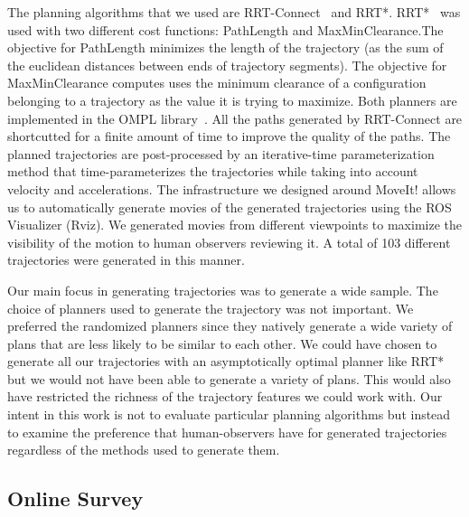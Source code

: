 \documentclass[letterpaper, 10 pt, conference]{ieeeconf}  %
\begin{document}
The planning algorithms that we used are RRT-Connect~\cite{kuffner2000rrt} and RRT*.  RRT*~\cite{frazzoli-RRTstar} was used with two different cost functions: PathLength and MaxMinClearance.The objective for PathLength minimizes the length of the trajectory (as the sum of the euclidean distances between ends of trajectory segments). The objective for MaxMinClearance computes uses the minimum clearance of a configuration belonging to a trajectory as the value it is trying to maximize. Both planners are implemented in the OMPL library~\cite{OMPL:2012}. All the paths generated by RRT-Connect are shortcutted for a finite amount of time to improve the quality of the paths. The planned trajectories are post-processed by an iterative-time parameterization method that time-parameterizes the trajectories while taking into account velocity and accelerations. The infrastructure we designed around MoveIt! allows us to automatically generate movies of the generated trajectories using the ROS Visualizer (Rviz). We generated movies from different viewpoints to maximize the visibility of the motion to human observers reviewing it. A total of 103 different trajectories were generated in this manner. 

Our main focus in generating trajectories was to generate a wide sample. The choice of planners used to generate the trajectory was not important. We preferred the randomized planners since they natively generate a wide variety of plans that are less likely to be similar to each other. We could have chosen to generate all our trajectories with an  asymptotically optimal planner like RRT* but we would not have been able to generate a variety of plans. This would also have restricted the richness of the trajectory features we could work with. Our intent in this work is not to evaluate particular planning algorithms but instead to examine the preference that human-observers have for generated trajectories regardless of the methods used to generate them. 

\subsection{Online Survey}
\end{document}
